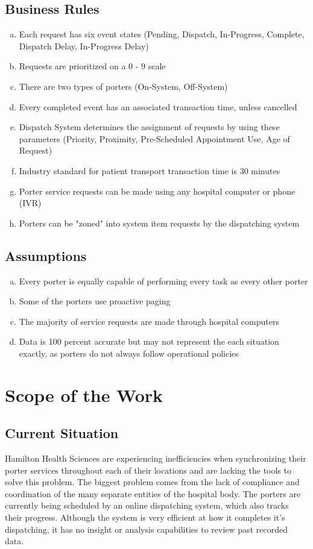 \documentclass[paper=letter, fontsize=10pt]{scrartcl}
\numberwithin{equation}{section}		%
\numberwithin{figure}{section}			%
\numberwithin{table}{section}				%
\begin{document}
\subsection{Business Rules}
\begin{enumerate}[(a)] 
	\item Each request has six event states (Pending, Dispatch, In-Progress, Complete, Dispatch Delay, In-Progress Delay)
	\item Requests are prioritized on a 0 - 9 scale
	\item There are two types of porters (On-System, Off-System)
	\item Every completed event has an associated transaction time, unless cancelled
	\item Dispatch System determines the assignment of requests by using these parameters (Priority, Proximity, Pre-Scheduled Appointment Use, Age of Request) 
	\item Industry standard for patient transport transaction time is 30 minutes
	\item Porter service requests can be made using any hospital computer or phone (IVR)
	\item Porters can be "zoned" into system item requests by the dispatching system  
\end{enumerate}	    
\subsection{Assumptions}
\begin{enumerate}[(a)]
	\item Every porter is equally capable of performing every task as every other porter
	\item Some of the porters use proactive paging  
	\item The majority of service requests are made through hospital computers
	\item Data is 100 percent accurate but may not represent the each situation exactly, as porters do not always follow operational policies 
\end{enumerate}

\section{Scope of the Work}
\subsection{Current Situation}
Hamilton Health Sciences are experiencing inefficiencies when synchronizing their porter services throughout each of their locations and are lacking the tools to solve this problem. The biggest problem comes from the lack of compliance and coordination of the many separate entities of the hospital body. The porters are currently being scheduled by an online dispatching system, which also tracks their progress. Although the system is very efficient at how it completes it's dispatching, it has no insight or analysis capabilities to review past recorded data. 
\end{document}
